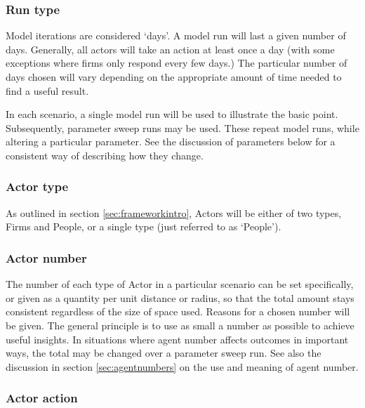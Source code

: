 \subsubsection{Run type}

Model iterations are considered `days'. A model run will last a given number of days. Generally, all actors will take an action at least once a day (with some exceptions where firms only respond every few days.) The particular number of days chosen will vary depending on the appropriate amount of time needed to find a useful result. 

In each scenario, a single model run will be used to illustrate the basic point. Subsequently, parameter sweep runs may be used. These repeat model runs, while altering a particular parameter. See the discussion of parameters below for a consistent way of describing how they change.

\subsubsection{Actor type}

As outlined in section \ref{sec:frameworkintro}, Actors will be either of two types, Firms and People, or a single type (just referred to as `People'). 

\subsubsection{Actor number}

The number of each type of Actor in a particular scenario can be set specifically, or given as a quantity per unit distance or radius, so that the total amount stays consistent regardless of the size of space used. Reasons for a chosen number will be given. The general principle is to use as small a number as possible to achieve useful insights. In situations where agent number affects outcomes in important ways, the total may be changed over a parameter sweep run. See also the discussion in section \ref{sec:agentnumbers} on the use and meaning of agent number.

\subsubsection{Actor action}

